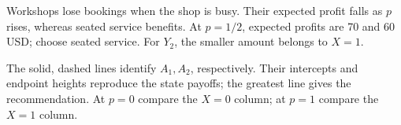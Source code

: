 Workshops lose bookings when the shop is busy. Their expected profit falls as $p$ rises, whereas seated service benefits. At $p=1/2$, expected profits are 70 and 60 USD; choose seated service. For $Y_2$, the smaller amount belongs to $X=1$.
\begin{center}\end{center}
The solid, dashed lines identify $A_1,A_2$, respectively. Their intercepts and endpoint heights reproduce the state payoffs; the greatest line gives the recommendation. At $p=0$ compare the $X=0$ column; at $p=1$ compare the $X=1$ column.
\clearpage
